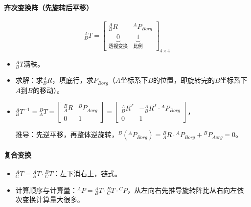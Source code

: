 \documentclass[
12pt, %
a4paper, 
oneside, %
headinclude,footinclude, %
]{scrartcl}
\begin{document}
\paragraph{齐次变换阵（先旋转后平移）}
$$ {}^A_B T = \begin{bmatrix} {}^A_B R & {}^A P_{Borg} \\ \underbrace{0}_{\text{透视变换}} & \underbrace{1}_{\text{比例}} \end{bmatrix}_{4 \times 4} $$
\begin{itemize}
\item $ {}^A_B T $满秩。
\item 求解：求$ {}^A_B R $，填底行，求$ P_{Borg} $（$ A $坐标系下$ B $的位置，即旋转完的$ B $坐标系下$ A $到$ B $的移动）。
\item $ {}^A_B T^{-1} = {}^B_A T = \begin{bmatrix} {}^B_A R & {}^B P_{Aorg} \\ 0 & 1 \end{bmatrix} = \begin{bmatrix} {}^A_B R^T & -{}^A_B R^T \cdot {}^A P_{Borg} \\ 0 & 1 \end{bmatrix} $，

推导：先逆平移，再整体逆旋转，$ {}^B({}^A P_{Borg}) = {}^B_A R \cdot {}^A P_{Borg} + {}^B P_{Aorg} = 0 $。
\end{itemize}
\paragraph{复合变换}
\begin{itemize}
\item $ {}^A_C T = {}^A_B T \cdot {}^B_C T $：左下消右上，链式。
\item 计算顺序与计算量：$ {}^A P = {}^A_B T \cdot {}^B_C T \cdot {}^C P $，从左向右先推导旋转阵比从右向左依次变换计算量大很多。
\end{itemize}
\end{document}

